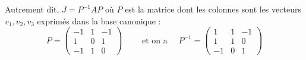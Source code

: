 \documentclass[12pt, class=report,crop=false]{standalone}
\begin{document}
\begin{exemple}
\begin{enumerate}
  Autrement dit, $J = P^{-1}AP$ où $P$ est la matrice dont les colonnes sont les vecteurs $v_1, v_2, v_3$ exprimés dans la base canonique :
$$P =  \begin{pmatrix}
-1 & 1 & -1 \\
1 & 0 & 1 \\
-1 & 1 & 0
\end{pmatrix} \qquad 
\text{ et on a } \quad
P^{-1} = \begin{pmatrix}
1 & 1 & -1 \\
1 & 1 & 0 \\
-1 & 0 & 1
\end{pmatrix}
$$
%
%  
%
%
%


\end{enumerate}
\end{exemple}
\end{document}
